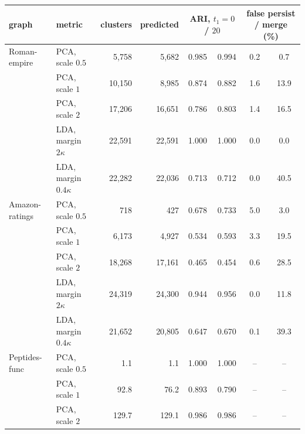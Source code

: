 \begin{tabular}{llrrcccc}
\toprule
graph & metric & clusters & predicted & \multicolumn{2}{c}{ARI, $t_1=0$ / $20$} & \multicolumn{2}{c}{false persist / merge (\%)}\\
\midrule
Roman-empire & PCA, scale $0.5$ & 5{,}758 & 5{,}682 & 0.985 & 0.994 & 0.2 & 0.7\\
 & PCA, scale $1$ & 10{,}150 & 8{,}985 & 0.874 & 0.882 & 1.6 & 13.9\\
 & PCA, scale $2$ & 17{,}206 & 16{,}651 & 0.786 & 0.803 & 1.4 & 16.5\\
 & LDA, margin $2\kappa$ & 22{,}591 & 22{,}591 & 1.000 & 1.000 & 0.0 & 0.0\\
 & LDA, margin $0.4\kappa$ & 22{,}282 & 22{,}036 & 0.713 & 0.712 & 0.0 & 40.5\\
\midrule
Amazon-ratings & PCA, scale $0.5$ & 718 & 427 & 0.678 & 0.733 & 5.0 & 3.0\\
 & PCA, scale $1$ & 6{,}173 & 4{,}927 & 0.534 & 0.593 & 3.3 & 19.5\\
 & PCA, scale $2$ & 18{,}268 & 17{,}161 & 0.465 & 0.454 & 0.6 & 28.5\\
 & LDA, margin $2\kappa$ & 24{,}319 & 24{,}300 & 0.944 & 0.956 & 0.0 & 11.8\\
 & LDA, margin $0.4\kappa$ & 21{,}652 & 20{,}805 & 0.647 & 0.670 & 0.1 & 39.3\\
\midrule
Peptides-func & PCA, scale $0.5$ & 1.1 & 1.1 & 1.000 & 1.000 & -- & --\\
 & PCA, scale $1$ & 92.8 & 76.2 & 0.893 & 0.790 & -- & --\\
 & PCA, scale $2$ & 129.7 & 129.1 & 0.986 & 0.986 & -- & --\\
\bottomrule
\end{tabular}
